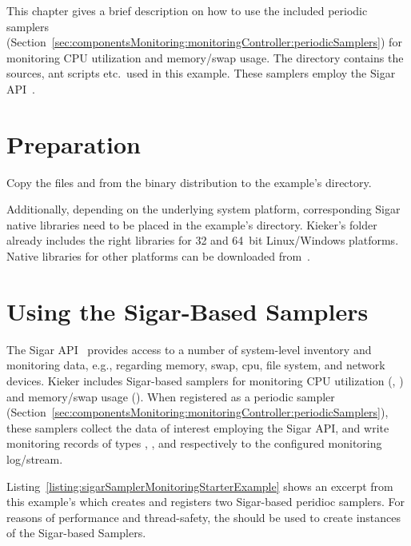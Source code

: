 This chapter gives a brief description on how to use the included %
periodic samplers (Section~\ref{sec:componentsMonitoring:monitoringController:periodicSamplers}) %
for monitoring CPU utilization and memory/swap usage. %
The directory \dir{\SigarExampleDirDistro/} contains the %
sources, ant scripts etc.\ used in this example. %
These samplers employ the Sigar API~\cite{HypericSigarWebsite}. \\%

\section{Preparation}

\begin{compactenum}
\item Copy the files \file{\mainJarEMF} and \file{\sigarJar} from the %
binary distribution to the example's  directory.
\item Additionally, depending on the underlying system platform, %
corresponding Sigar native libraries need to be placed in the example's  directory. %
Kieker's  folder already includes the right libraries for 32 and 64~bit Linux/Windows platforms. %
Native libraries for other platforms can be downloaded from~\cite{HypericSigarWebsite}. %
\end{compactenum}

\section{Using the Sigar-Based Samplers}

The Sigar API~\cite{HypericSigarWebsite} provides access to a number of system-level inventory and monitoring data, %
e.g., regarding memory, swap, cpu, file system, and network devices. %
Kieker includes Sigar-based samplers %
for monitoring CPU utilization %
(, ) %
and memory/swap usage (). %
When registered as a periodic sampler (Section~\ref{sec:componentsMonitoring:monitoringController:periodicSamplers}), %
these samplers collect the data of interest employing the Sigar API, %
and write monitoring records of types , %
, and  respectively %
to the configured monitoring log/stream. %

Listing~\ref{listing:sigarSamplerMonitoringStarterExample} shows an excerpt from %
this example's  %
which creates and registers two Sigar-based peridioc samplers. %
For reasons of performance and thread-safety, the  %
should be used to create instances of the Sigar-based Samplers. 


